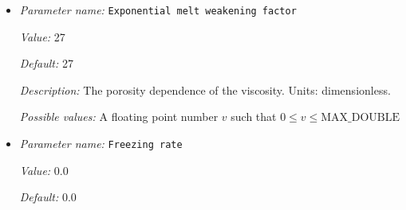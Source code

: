 \begin{itemize}
{\it Value:} 200.0


{\it Default:} 200.0


{\it Description:} The solidus temperature change for a depletion of 100\%. For positive values, the solidus gets increased for a positive peridotite field (depletion) and lowered for a negative peridotite field (enrichment). Scaling with depletion is linear. Only active when fractional melting is used. Units: $K$.


{\it Possible values:} A floating point number $v$ such that $0 \leq v \leq \text{MAX\_DOUBLE}$
\item {\it Parameter name:} {\tt Exponential melt weakening factor}
\label{parameters:Material model/Melt simple/Exponential melt weakening factor}
\label{parameters:Material_20model/Melt_20simple/Exponential_20melt_20weakening_20factor}


{\it Value:} 27


{\it Default:} 27


{\it Description:} The porosity dependence of the viscosity. Units: dimensionless.


{\it Possible values:} A floating point number $v$ such that $0 \leq v \leq \text{MAX\_DOUBLE}$
\item {\it Parameter name:} {\tt Freezing rate}
\label{parameters:Material model/Melt simple/Freezing rate}
\label{parameters:Material_20model/Melt_20simple/Freezing_20rate}


{\it Value:} 0.0


{\it Default:} 0.0



\end{itemize}
